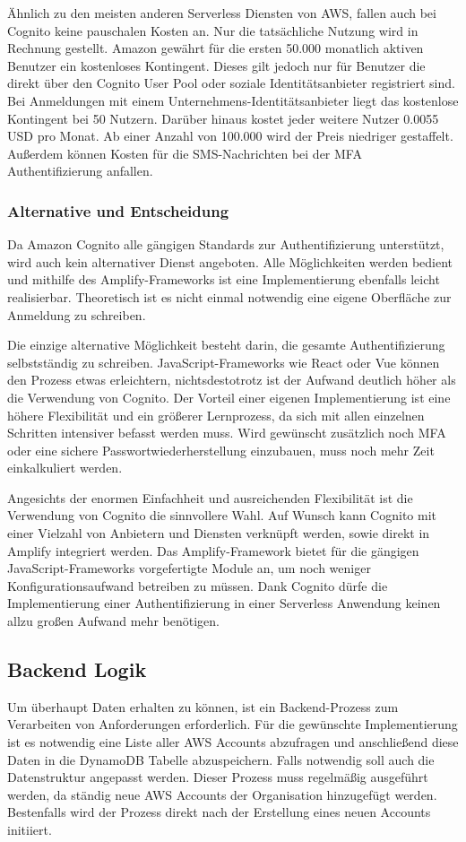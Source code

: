 {Ähnlich zu den meisten anderen Serverless Diensten von AWS, fallen auch bei Cognito keine pauschalen Kosten an.
Nur die tatsächliche Nutzung wird in Rechnung gestellt.
Amazon gewährt für die ersten 50.000 monatlich aktiven Benutzer ein kostenloses Kontingent.
Dieses gilt jedoch nur für Benutzer die direkt über den Cognito User Pool oder soziale Identitätsanbieter registriert sind.
Bei Anmeldungen mit einem Unternehmens-Identitätsanbieter liegt das kostenlose Kontingent bei 50 Nutzern.
Darüber hinaus kostet jeder weitere Nutzer 0.0055 USD pro Monat.
Ab einer Anzahl von 100.000 wird der Preis niedriger gestaffelt.
Außerdem können Kosten für die SMS-Nachrichten bei der MFA Authentifizierung anfallen.  \cite[]{CognitoPreise}


\subsubsection{Alternative und Entscheidung}

Da Amazon Cognito alle gängigen Standards zur Authentifizierung unterstützt, wird auch kein alternativer Dienst angeboten.
Alle Möglichkeiten werden bedient und mithilfe des Amplify-Frameworks ist eine Implementierung ebenfalls leicht realisierbar.
Theoretisch ist es nicht einmal notwendig eine eigene Oberfläche zur Anmeldung zu schreiben.

Die einzige alternative Möglichkeit besteht darin, die gesamte Authentifizierung selbstständig zu schreiben.
JavaScript-Frameworks wie React oder Vue können den Prozess etwas erleichtern, nichtsdestotrotz ist der Aufwand deutlich höher als die Verwendung von Cognito.
Der Vorteil einer eigenen Implementierung ist eine höhere Flexibilität und ein größerer Lernprozess, da sich mit allen einzelnen Schritten intensiver befasst werden muss.
Wird gewünscht zusätzlich noch MFA oder eine sichere Passwortwiederherstellung einzubauen, muss noch mehr Zeit einkalkuliert werden.

Angesichts der enormen Einfachheit und ausreichenden Flexibilität ist die Verwendung von Cognito die sinnvollere Wahl.
Auf Wunsch kann Cognito mit einer Vielzahl von Anbietern und Diensten verknüpft werden, sowie direkt in Amplify integriert werden.
Das Amplify-Framework bietet für die gängigen JavaScript-Frameworks vorgefertigte Module an, um noch weniger Konfigurationsaufwand betreiben zu müssen.
Dank Cognito dürfe die Implementierung einer Authentifizierung in einer Serverless Anwendung keinen allzu großen Aufwand mehr benötigen.


\subsection{Backend Logik}
Um überhaupt Daten erhalten zu können, ist ein Backend-Prozess zum Verarbeiten von Anforderungen erforderlich.
Für die gewünschte Implementierung ist es notwendig eine Liste aller AWS Accounts abzufragen und anschließend diese Daten in die DynamoDB Tabelle abzuspeichern.
Falls notwendig soll auch die Datenstruktur angepasst werden.
Dieser Prozess muss regelmäßig ausgeführt werden, da ständig neue AWS Accounts der Organisation hinzugefügt werden.
Bestenfalls wird der Prozess direkt nach der Erstellung eines neuen Accounts initiiert.

}
